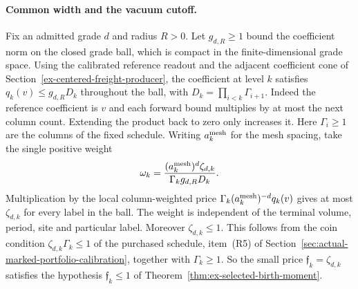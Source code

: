 \paragraph{Common width and the vacuum cutoff.}
Fix an admitted grade $d$ and radius $R>0$. Let $g_{d,R}\ge1$
bound the coefficient norm on the closed grade ball, which is
compact in the finite-dimensional grade space. Using the
calibrated reference readout and the adjacent coefficient cone of
Section~\ref{ex-centered-freight-producer}, the coefficient at level
$k$ satisfies $q_k(v)\le g_{d,R}D_k$ throughout the ball, with
$D_k=\prod_{i<k}\Gamma_{i+1}$. Indeed the reference coefficient is
$v$ and each forward bound multiplies by at most the next column
count. Extending the product back to zero only increases it. Here
$\Gamma_i\ge1$ are the columns of the fixed schedule. Writing $a_k^{\rm mesh}$
for the mesh spacing, take the single positive weight
\[
 \omega_k=\frac{(a_k^{\rm mesh})^d\zeta_{d,k}}
                 {\Gamma_k g_{d,R}D_k}.
\]
Multiplication by the local column-weighted price
$\Gamma_k(a_k^{\rm mesh})^{-d}q_k(v)$ gives at most
$\zeta_{d,k}$ for every label in the ball. The weight is independent
of the terminal volume, period, site and particular label. Moreover
$\zeta_{d,k}\le1$. This follows from the coin condition
$\zeta_{d,k}\Gamma_k\le1$ of the purchased schedule, item~(R5) of
Section~\ref{sec:actual-marked-portfolio-calibration}, together with
$\Gamma_k\ge1$. So the small price $\mathfrak f_k=\zeta_{d,k}$ satisfies
the hypothesis $\mathfrak f_k\le1$ of
Theorem~\ref{thm:ex-selected-birth-moment}.

